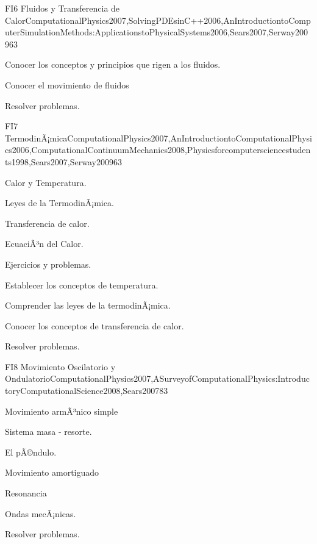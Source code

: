\begin{syllabus}
\begin{unit}{FI6 Fluidos y Transferencia de Calor}{ComputationalPhysics2007,SolvingPDEsinC++2006,AnIntroductiontoComputerSimulationMethods:ApplicationstoPhysicalSystems2006,Sears2007,Serway2009}{6}{3}
   \begin{unitgoals}
      \item Conocer los conceptos y principios que rigen a los fluidos.
      \item Conocer el movimiento de fluidos 
      \item Resolver problemas.
   \end{unitgoals}
\end{unit}

\begin{unit}{FI7 TermodinÃ¡mica}{ComputationalPhysics2007,AnIntroductiontoComputationalPhysics2006,ComputationalContinuumMechanics2008,Physicsforcomputersciencestudents1998,Sears2007,Serway2009}{6}{3}
\begin{topics}
      \item Calor y Temperatura.
      \item Leyes de la TermodinÃ¡mica.
      \item Transferencia de calor.
      \item EcuaciÃ³n del Calor.
      \item Ejercicios y problemas.
  \end{topics}

   \begin{unitgoals}
      \item Establecer los conceptos de temperatura.
      \item Comprender las leyes de la termodinÃ¡mica.
      \item Conocer los conceptos de transferencia de calor.
      \item Resolver problemas.
   \end{unitgoals}
\end{unit}

\begin{unit}{FI8 Movimiento Oscilatorio y Ondulatorio}{ComputationalPhysics2007,ASurveyofComputationalPhysics:IntroductoryComputationalScience2008,Sears2007}{8}{3}
\begin{topics}
      \item Movimiento armÃ³nico simple
      \item Sistema masa - resorte.
      \item El pÃ©ndulo.
      \item Movimiento amortiguado
      \item Resonancia
      \item Ondas mecÃ¡nicas.
      \item Resolver problemas.
  \end{topics}


\end{unit}
\end{syllabus}
